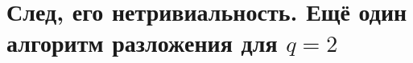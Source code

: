 \section{
 \texorpdfstring{След, его нетривиальность. Ещё один алгоритм разложения для $q = 2$} .
}
